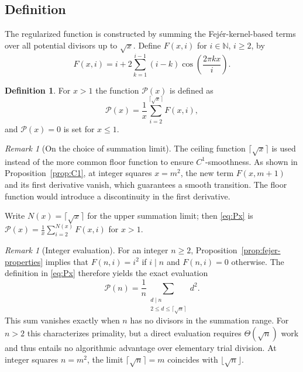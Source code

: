 \documentclass[11pt,a4paper]{amsart}
\theoremstyle{plain}
\theoremstyle{definition}
\newtheorem{definition}[theorem]{Definition}
\theoremstyle{remark}
\newtheorem{remark}[theorem]{Remark}
\begin{document}
\subsection{Definition}
The regularized function is constructed by summing the Fejér-kernel-based terms over all potential divisors up to $\sqrt{x}$.
Define $F(x,i)$ for $i\in\mathbb{N}$, $i\ge 2$, by
\begin{equation}\label{eq:Fxi}
F(x,i) = i+2\sum_{k=1}^{i-1}(i-k)\cos\left(\frac{2\pi k x}{i}\right).
\end{equation}


\begin{definition}\label{def:Px}
For $x>1$ the function $\mathcal{P}(x)$ is defined as
\begin{equation}\label{eq:Px}
\mathcal{P}(x)=\frac{1}{x}\sum_{i=2}^{\lceil\sqrt{x}\rceil} F(x,i),
\end{equation}
and $\mathcal{P}(x)=0$ is set for $x\le1$.
\end{definition}

\begin{remark}[On the choice of summation limit]
The ceiling function $\lceil\sqrt{x}\rceil$ is used instead of the more common floor function to ensure $C^1$-smoothness. As shown in Proposition~\ref{prop:C1}, at integer squares $x=m^2$, the new term $F(x, m+1)$ and its first derivative vanish, which guarantees a smooth transition. The floor function would introduce a discontinuity in the first derivative.
\end{remark}

Write $N(x)=\lceil\sqrt{x}\rceil$ for the upper summation limit; then \eqref{eq:Px} is $\mathcal{P}(x)=\frac{1}{x}\sum_{i=2}^{N(x)} F(x,i)$ for $x>1$.

\begin{remark}[Integer evaluation]\label{rem:integer-eval}
For an integer $n\ge 2$, Proposition~\ref{prop:fejer-properties} implies that $F(n,i)=i^2$ if $i\mid n$ and $F(n,i)=0$ otherwise. The definition in \eqref{eq:Px} therefore yields the exact evaluation
\[
\mathcal P(n)=\frac{1}{n}\sum_{\substack{d\mid n \\ 2\le d\le \lceil\sqrt{n}\rceil}} d^2.
\]
This sum vanishes exactly when $n$ has no divisors in the summation range. For $n>2$ this characterizes primality, but a direct evaluation requires $\Theta(\sqrt n)$ work and thus entails no algorithmic advantage over elementary trial division. At integer squares $n=m^2$, the limit $\lceil\sqrt{n}\rceil=m$ coincides with $\lfloor\sqrt{n}\rfloor$.
\end{remark}
\end{document}
